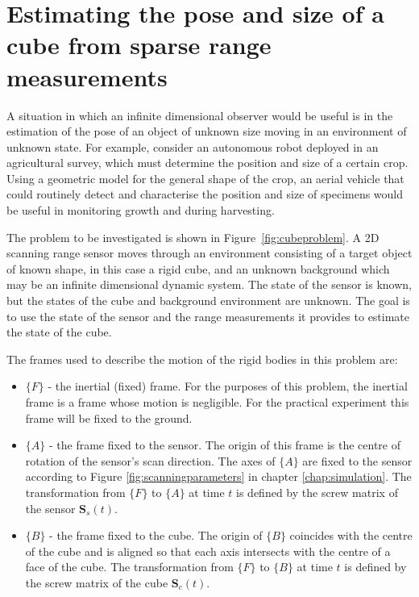 \section{Estimating the pose and size of a cube from sparse range measurements}

A situation in which an infinite dimensional observer would be useful is in the estimation of the pose of an object of unknown size moving in an environment of unknown state.
For example, consider an autonomous robot deployed in an agricultural survey, which must determine the position and size of a certain crop. Using a geometric model for the general shape of the crop, an aerial vehicle that could routinely detect and characterise the position and size of specimens would be useful in monitoring growth and during harvesting.

The problem to be investigated is shown in Figure~\ref{fig:cubeproblem}. A 2D scanning range sensor moves through an environment consisting of a target object of known shape, in this case a rigid cube, and an unknown background which may be an infinite dimensional dynamic system. The state of the sensor is known, but the states of the cube and background environment are unknown. The goal is to use the state of the sensor and the range measurements it provides to estimate the state of the cube.

The frames used to describe the motion of the rigid bodies in this problem are:
\begin{itemize}
\item $\{F\}$ - the inertial (fixed) frame. For the purposes of this problem, the inertial frame is a frame whose motion is negligible. For the practical experiment this frame will be fixed to the ground.
\item $\{A\}$ - the frame fixed to the sensor. The origin of this frame is the centre of rotation of the sensor's scan direction. The axes of $\{A\}$ are fixed to the sensor according to Figure \ref{fig:scanningparameters} in chapter \ref{chap:simulation}. The transformation from $\{F\}$ to $\{A\}$ at time $t$ is defined by the screw matrix of the sensor $\mathbf{S}_{s}(t)$.
\item $\{B\}$ - the frame fixed to the cube. The origin of $\{B\}$ coincides with the centre of the cube and is aligned so that each axis intersects with the centre of a face of the cube. The transformation from $\{F\}$ to $\{B\}$ at time $t$ is defined by the screw matrix of the cube $\mathbf{S}_{c}(t)$.
\end{itemize} 

